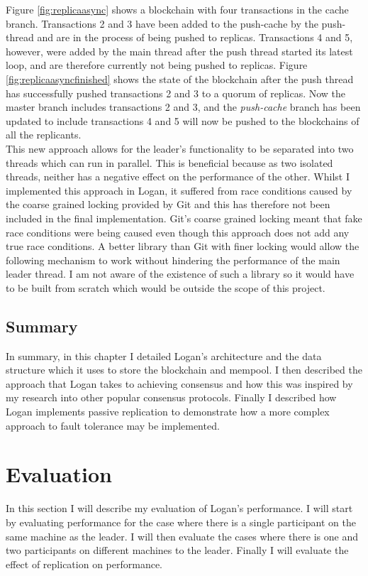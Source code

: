 \documentclass[12pt,a4paper,twoside,openright]{report}
\begin{document}
	Figure \ref{fig:replicaasync} shows a blockchain with four transactions in the cache branch.
	Transactions 2 and 3 have been added to the push-cache by the push-thread and are in the process of being pushed to replicas. 
	Transactions 4 and 5, however, were added by the main thread after the push thread started its latest loop, and are therefore currently not being pushed to replicas.
	Figure \ref{fig:replicaasyncfinished} shows the state of the blockchain after the push thread has successfully pushed transactions 2 and 3 to a quorum of replicas.
	Now the master branch includes transactions 2 and 3, and the \textit{push-cache} branch has been updated to include transactions 4 and 5 will now be pushed to the blockchains of all the replicants.\\

	This new approach allows for the leader's functionality to be separated into two threads which can run in parallel. 
	This is beneficial because as two isolated threads, neither has a negative effect on the performance of the other.
	Whilst I implemented this approach in Logan, it suffered from race conditions caused by the coarse grained locking provided by Git and this has therefore not been included in the final implementation.
	Git's coarse grained locking meant that fake race conditions were being caused even though this approach does not add any true race conditions.
	A better library than Git with finer locking would allow the following mechanism to work without hindering the performance of the main leader thread.
	I am not aware of the existence of such a library so it would have to be built from scratch which would be outside the scope of this project.

	\section{Summary}
	In summary, in this chapter I detailed Logan's architecture and the data structure which it uses to store the blockchain and mempool.
	I then described the approach that Logan takes to achieving consensus and how this was inspired by my research into other popular consensus protocols.
	Finally I described how Logan implements passive replication to demonstrate how a more complex approach to fault tolerance may be implemented.

	\chapter{Evaluation}
	In this section I will describe my evaluation of Logan's performance.
	I will start by evaluating performance for the case where there is a single participant on the same machine as the leader. 
	I will then evaluate the cases where there is one and two participants on different machines to the leader.
	Finally I will evaluate the effect of replication on performance.\\
\end{document}
